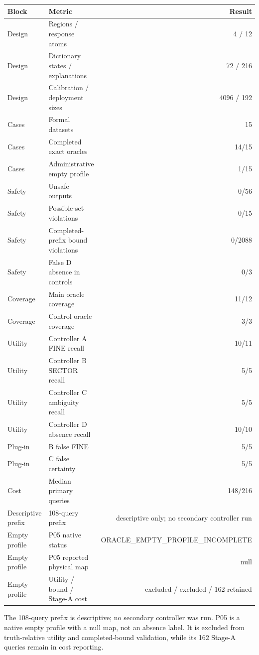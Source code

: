 \begin{tabular}{llr}
\toprule
Block & Metric & Result \\
\midrule
Design & Regions / response atoms & 4 / 12 \\
Design & Dictionary states / explanations & 72 / 216 \\
Design & Calibration / deployment sizes & 4096 / 192 \\
Cases & Formal datasets & 15 \\
Cases & Completed exact oracles & 14/15 \\
Cases & Administrative empty profile & 1/15 \\
Safety & Unsafe outputs & 0/56 \\
Safety & Possible-set violations & 0/15 \\
Safety & Completed-prefix bound violations & 0/2088 \\
Safety & False D absence in controls & 0/3 \\
Coverage & Main oracle coverage & 11/12 \\
Coverage & Control oracle coverage & 3/3 \\
Utility & Controller A FINE recall & 10/11 \\
Utility & Controller B SECTOR recall & 5/5 \\
Utility & Controller C ambiguity recall & 5/5 \\
Utility & Controller D absence recall & 10/10 \\
Plug-in & B false FINE & 5/5 \\
Plug-in & C false certainty & 5/5 \\
Cost & Median primary queries & 148/216 \\
Descriptive prefix & 108-query prefix & descriptive only; no secondary controller run \\
Empty profile & P05 native status & ORACLE\_EMPTY\_PROFILE\_INCOMPLETE \\
Empty profile & P05 reported physical map & null \\
Empty profile & Utility / bound / Stage-A cost & excluded / excluded / 162 retained \\
\bottomrule
\end{tabular}
\par\footnotesize The 108-query prefix is descriptive; no secondary controller was run. P05 is a native empty profile with a null map, not an absence label. It is excluded from truth-relative utility and completed-bound validation, while its 162 Stage-A queries remain in cost reporting.
